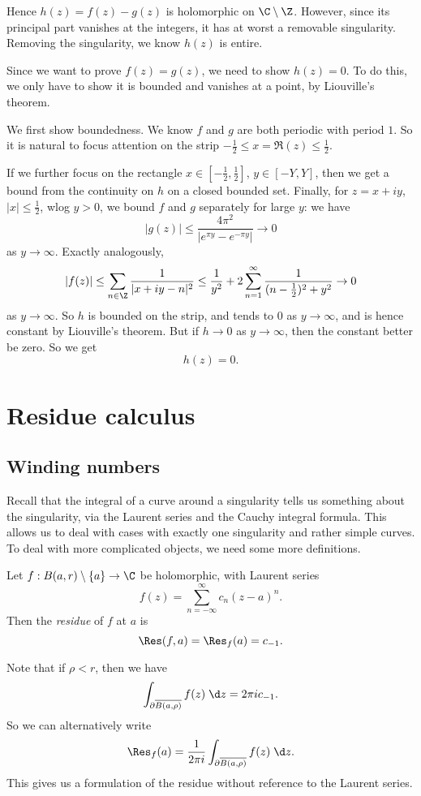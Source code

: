 \documentclass[a4paper]{article}
\begin{document}
\begin{eg}
  Hence $h(z) = f(z) - g(z)$ is holomorphic on $\C \setminus \Z$. However, since its principal part vanishes at the integers, it has at worst a removable singularity. Removing the singularity, we know $h(z)$ is entire.

  Since we want to prove $f(z) = g(z)$, we need to show $h(z) = 0$. To do this, we only have to show it is bounded and vanishes at a point, by Liouville's theorem.

  We first show boundedness. We know $f$ and $g$ are both periodic with period $1$. So it is natural to focus attention on the strip $-\frac{1}{2} \leq x = \Re(z) \leq \frac{1}{2}$.

  If we further focus on the rectangle $x \in [-\frac{1}{2}, \frac{1}{2}]$, $y \in [-Y, Y]$, then we get a bound from the continuity on $h$ on a closed bounded set. Finally, for $z = x + iy$, $|x| \leq \frac{1}{2}$, wlog $y > 0$, we bound $f$ and $g$ separately for large $y$: we have
  \[
    |g(z)| \leq \frac{4\pi^2}{|e^{\pi y} - e^{- \pi y}|} \to 0
  \]
  as $y \to \infty$. Exactly analogously,
  \[
    |f(z)| \leq \sum_{n \in \Z} \frac{1}{|x + iy - n|^2} \leq \frac{1}{y^2} + 2 \sum_{n = 1}^\infty \frac{1}{(n - \frac{1}{2})^2 + y^2} \to 0
  \]
  as $y \to \infty$. So $h$ is bounded on the strip, and tends to $0$ as $y \to \infty$, and is hence constant by Liouville's theorem. But if $h \to 0$ as $y \to \infty$, then the constant better be zero. So we get
  \[
    h(z) = 0.
  \]
\end{eg}

\section{Residue calculus}
\subsection{Winding numbers}
Recall that the integral of a curve around a singularity tells us something about the singularity, via the Laurent series and the Cauchy integral formula. This allows us to deal with cases with exactly one singularity and rather simple curves. To deal with more complicated objects, we need some more definitions.

\begin{defi}[Residue]
  Let $f: B (a, r) \setminus \{a\} \to \C$ be holomorphic, with Laurent series
  \[
    f(z) = \sum_{n = -\infty}^\infty c_n (z - a)^n.
  \]
  Then the \emph{residue} of $f$ at $a$ is
  \[
    \Res(f, a) = \Res_f(a) = c_{-1}.
  \]
\end{defi}
Note that if $\rho < r$, then we have
\[
  \int_{\partial \overline{B(a, \rho)}} f(z)\;\d z = 2\pi i c_{-1}.
\]
So we can alternatively write
\[
  \Res_f(a) = \frac{1}{2 \pi i}\int_{\partial \overline{B(a, \rho)}} f(z)\;\d z.
\]
This gives us a formulation of the residue without reference to the Laurent series.
\end{document}
